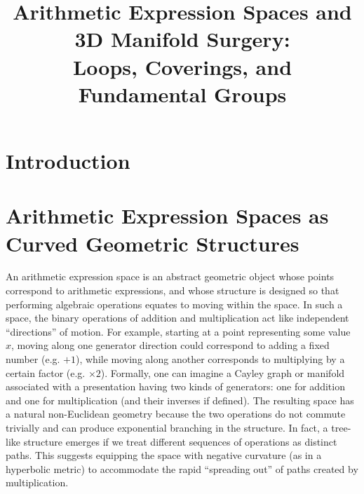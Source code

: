 \documentclass[11pt]{article}
\theoremstyle{remark}
\begin{document}
    \title{Arithmetic Expression Spaces and 3D Manifold Surgery:\\
    Loops, Coverings, and Fundamental Groups}
    \author{}
    \date{}

    \maketitle

    \section*{Introduction}

\section*{Arithmetic Expression Spaces as Curved Geometric Structures}
An arithmetic expression space is an abstract geometric object whose points correspond to arithmetic expressions, and whose structure is designed so that performing algebraic operations equates to moving within the space. In such a space, the binary operations of addition and multiplication act like independent “directions” of motion. For example, starting at a point representing some value $x$, moving along one generator direction could correspond to adding a fixed number (e.g. $+1$), while moving along another corresponds to multiplying by a certain factor (e.g. $\times 2$). Formally, one can imagine a Cayley graph or manifold associated with a presentation having two kinds of generators: one for addition and one for multiplication (and their inverses if defined). The resulting space has a natural non-Euclidean geometry because the two operations do not commute trivially and can produce exponential branching in the structure. In fact, a tree-like structure emerges if we treat different sequences of operations as distinct paths. This suggests equipping the space with negative curvature (as in a hyperbolic metric) to accommodate the rapid “spreading out” of paths created by multiplication.
\end{document}
